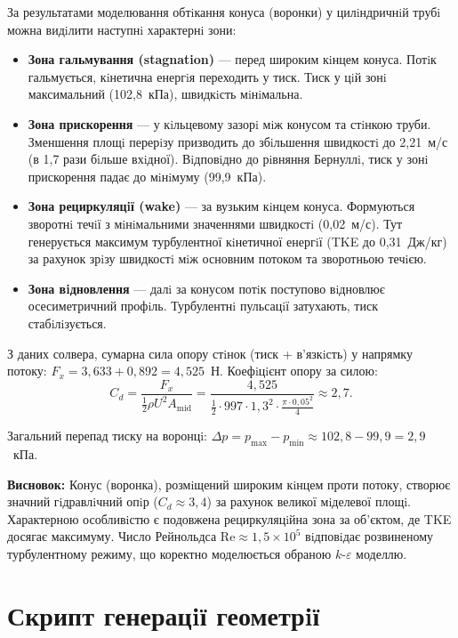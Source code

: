 За результатами моделювання обтiкання конуса (воронки) у цилiндричнiй трубi можна видiлити наступнi характернi зони:

\begin{itemize}
  \item \textbf{Зона гальмування (stagnation)} --- перед широким кiнцем конуса. Потiк гальмується, кiнетична енергiя переходить у тиск. Тиск у цiй зонi максимальний (102{,}8~кПа), швидкiсть мiнiмальна.

  \item \textbf{Зона прискорення} --- у кiльцевому зазорi мiж конусом та стiнкою труби. Зменшення площi перерiзу призводить до збiльшення швидкостi до 2{,}21~м/с (в 1{,}7 рази бiльше вхiдної). Вiдповiдно до рiвняння Бернуллi, тиск у зонi прискорення падає до мiнiмуму (99{,}9~кПа).

  \item \textbf{Зона рециркуляцiї (wake)} --- за вузьким кiнцем конуса. Формуються зворотнi течiї з мiнiмальними значеннями швидкостi (0{,}02~м/с). Тут генерується максимум турбулентної кiнетичної енергiї (TKE до 0{,}31~Дж/кг) за рахунок зрiзу швидкостi мiж основним потоком та зворотньою течiєю.

  \item \textbf{Зона вiдновлення} --- далi за конусом потiк поступово вiдновлює осесиметричний профiль. Турбулентнi пульсацiї затухають, тиск стабiлiзується.
\end{itemize}

З даних солвера, сумарна сила опору стiнок (тиск + в'язкiсть) у напрямку потоку: $F_x = 3{,}633 + 0{,}892 = 4{,}525$~Н. Коефiцiєнт опору за силою:
\[
  C_d = \frac{F_x}{\frac{1}{2}\rho U^2 A_{\mathrm{mid}}}
  = \frac{4{,}525}{\frac{1}{2} \cdot 997 \cdot 1{,}3^2 \cdot \frac{\pi \cdot 0{,}05^2}{4}}
  \approx 2{,}7.
\]

Загальний перепад тиску на воронцi: $\Delta p = p_{\max} - p_{\min} \approx 102{,}8 - 99{,}9 = 2{,}9$~кПа.

\textbf{Висновок:} Конус (воронка), розмiщений широким кiнцем проти потоку, створює значний гiдравлiчний опiр ($C_d \approx 3{,}4$) за рахунок великої мiделевої площi. Характерною особливiстю є подовжена рециркуляцiйна зона за об'єктом, де TKE досягає максимуму. Число Рейнольдса $\mathrm{Re} \approx 1{,}5 \times 10^5$ вiдповiдає розвиненому турбулентному режиму, що коректно моделюється обраною $k$-$\varepsilon$ моделлю.

\appendix
\section{Скрипт генерацiї геометрiї}

